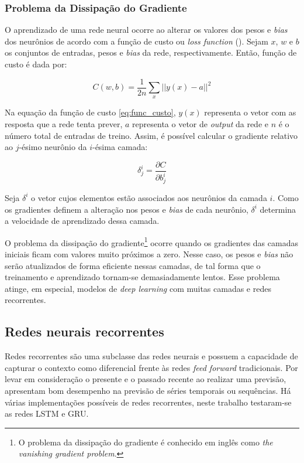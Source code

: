 \subsubsection{Problema da Dissipação do Gradiente}
\label{sec:vanishing_gradient_problem}

O aprendizado de uma rede neural ocorre ao alterar os valores dos pesos
e \textit{bias} dos neurônios de acordo com a função de custo ou \textit{loss function} (\cite{neuralnetworksanddeeplearning}). 
Sejam $x$, $w$ e $b$ os conjuntos de entradas,
pesos e \textit{bias} da rede, respectivamente. Então, função de custo é dada por:

\begin{equation}
  C(w,b) = \frac{1}{2n}\sum_x || y(x) - a ||^2
\label{eq:func_custo}
\end{equation}

Na equação da função de custo \ref{eq:func_custo}, $y(x)$ representa o vetor com as resposta
que a rede tenta prever, $a$ representa o vetor de \textit{output} da rede e 
$n$ é o número total de entradas de treino. Assim, é possível calcular o gradiente
relativo ao $j$-ésimo neurônio da $i$-ésima camada:

\begin{equation}
  \delta_j^i = \frac{\partial C}{\partial b_j^i}
\label{eq:func_grad}
\end{equation}

Seja $\delta^i$ o vetor cujos elementos estão associados
aos neurônios da camada $i$. Como os gradientes definem a alteração nos pesos 
e \textit{bias}
de cada neurônio,  $\delta^i$  determina a velocidade de aprendizado dessa camada.

O problema da dissipação do gradiente\footnote{O problema da dissipação do gradiente 
é conhecido em inglês como \textit{the vanishing gradient problem}.
} ocorre quando os gradientes das camadas iniciais ficam com valores 
muito próximos a zero. Nesse caso, os pesos e \textit{bias} não serão atualizados
de forma eficiente nessas camadas, de tal forma que o treinamento e aprendizado
tornam-se demasiadamente lentos. Esse problema atinge, em especial, modelos 
de \textit{deep learning} com muitas camadas e redes recorrentes.
        
\subsection{Redes neurais recorrentes}
\label{rnn}

Redes recorrentes são uma subclasse das redes neurais e possuem a capacidade
de capturar o contexto como diferencial frente às redes \textit{feed forward}
tradicionais. Por levar em consideração o presente e o passado recente ao 
realizar uma previsão, apresentam bom desempenho na previsão de séries 
temporais ou sequências. Há várias implementações possíveis de redes 
recorrentes, neste trabalho testaram-se as redes LSTM e GRU.

